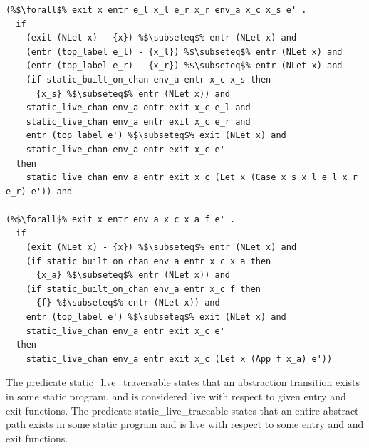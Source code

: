 \documentclass{article}
\begin{document}
\begin{lstlisting}[language=logic, escapechar=\%]
(%$\forall$% exit x entr e_l x_l e_r x_r env_a x_c x_s e' .
  if 
    (exit (NLet x) - {x}) %$\subseteq$% entr (NLet x) and
    (entr (top_label e_l) - {x_l}) %$\subseteq$% entr (NLet x) and
    (entr (top_label e_r) - {x_r}) %$\subseteq$% entr (NLet x) and
    (if static_built_on_chan env_a entr x_c x_s then
      {x_s} %$\subseteq$% entr (NLet x)) and
    static_live_chan env_a entr exit x_c e_l and
    static_live_chan env_a entr exit x_c e_r and
    entr (top_label e') %$\subseteq$% exit (NLet x) and
    static_live_chan env_a entr exit x_c e'
  then 
    static_live_chan env_a entr exit x_c (Let x (Case x_s x_l e_l x_r e_r) e')) and

(%$\forall$% exit x entr env_a x_c x_a f e' .
  if
    (exit (NLet x) - {x}) %$\subseteq$% entr (NLet x) and
    (if static_built_on_chan env_a entr x_c x_a then
      {x_a} %$\subseteq$% entr (NLet x)) and
    (if static_built_on_chan env_a entr x_c f then
      {f} %$\subseteq$% entr (NLet x)) and
    entr (top_label e') %$\subseteq$% exit (NLet x) and
    static_live_chan env_a entr exit x_c e'
  then
    static_live_chan env_a entr exit x_c (Let x (App f x_a) e'))

  \end{lstlisting}

The predicate static\_live\_traversable states that an abstraction transition exists in some
static program, and is considered live with respect to given entry and exit functions.  The predicate
static\_live\_traceable states that an entire abstract path exists in some static program and is live with
respect to some entry and and exit functions.   
\end{document}
